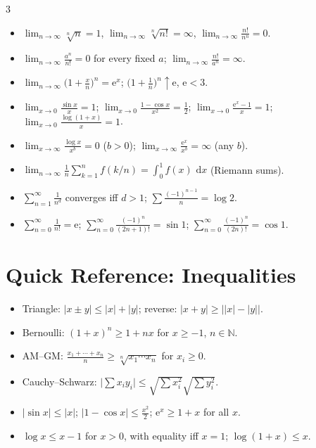 \documentclass[10pt,a4paper,landscape]{article}
\theoremstyle{definition}
\theoremstyle{plain}
\theoremstyle{remark}
\newcommand{\N}{\mathbb{N}}
\newcommand{\dd}{\,\mathrm{d}}
\newcommand{\e}{\mathrm{e}}
\newcommand{\abs}[1]{\lvert #1 \rvert}
\newcommand{\oo}{\infty}
\begin{document}
\begin{multicols*}{3}
\begin{itemize}
\item $\lim_{n\to\oo} \sqrt[n]{n} = 1$, $\lim_{n\to\oo} \sqrt[n]{n!} = \oo$, $\lim_{n\to\oo} \frac{n!}{n^n} = 0$.
\item $\lim_{n\to\oo} \frac{a^n}{n!} = 0$ for every fixed $a$; $\lim_{n\to\oo} \frac{n!}{a^n} = \oo$.
\item $\lim_{n\to\oo} \bigl(1 + \frac{x}{n}\bigr)^n = \e^x$; $\bigl(1+\frac{1}{n}\bigr)^n \uparrow \e$, $\e < 3$.
\item $\lim_{x\to 0} \frac{\sin x}{x} = 1$; $\lim_{x\to 0} \frac{1 - \cos x}{x^2} = \frac{1}{2}$; $\lim_{x\to 0} \frac{\e^x - 1}{x} = 1$; $\lim_{x\to 0} \frac{\log(1+x)}{x} = 1$.
\item $\lim_{x\to\oo} \frac{\log x}{x^b} = 0$ ($b>0$); $\lim_{x\to\oo} \frac{\e^x}{x^b} = \oo$ (any $b$).
\item $\lim_{n\to\oo} \frac{1}{n} \sum_{k=1}^{n} f(k/n) = \int_0^1 f(x)\,\dd x$ (Riemann sums).
\item $\sum_{n=1}^{\oo} \frac{1}{n^d}$ converges iff $d > 1$; $\sum \frac{(-1)^{n-1}}{n} = \log 2$.
\item $\sum_{n=0}^{\oo} \frac{1}{n!} = \e$; $\sum_{n=0}^{\oo} \frac{(-1)^n}{(2n+1)!} = \sin 1$; $\sum_{n=0}^{\oo} \frac{(-1)^n}{(2n)!} = \cos 1$.
\end{itemize}

\section{Quick Reference: Inequalities}

\begin{itemize}
\item Triangle: $\abs{x \pm y} \le \abs{x} + \abs{y}$; reverse: $\abs{x+y} \ge \bigl\lvert\abs{x} - \abs{y}\bigr\rvert$.
\item Bernoulli: $(1+x)^n \ge 1 + nx$ for $x \ge -1$, $n \in \N$.
\item AM--GM: $\frac{x_1 + \cdots + x_n}{n} \ge \sqrt[n]{x_1 \cdots x_n}$ for $x_i \ge 0$.
\item Cauchy--Schwarz: $\abs{\sum x_i y_i} \le \sqrt{\sum x_i^2}\sqrt{\sum y_i^2}$.
\item $\abs{\sin x} \le \abs{x}$; $\abs{1 - \cos x} \le \frac{x^2}{2}$; $\e^x \ge 1 + x$ for all $x$.
\item $\log x \le x - 1$ for $x > 0$, with equality iff $x = 1$; $\log(1+x) \le x$.
\end{itemize}

\end{multicols*}
\end{document}
